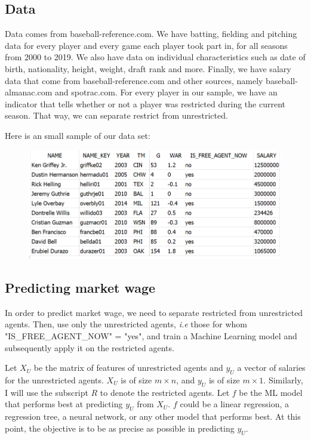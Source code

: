 \documentclass[12pt,a4paper]{article}
\begin{document}
\subsection{Data}

Data comes from baseball-reference.com. We have batting, fielding and pitching data for every player and every game each player took part in, for all seasons from 2000 to 2019. We also have data on individual characteristics such as date of birth, nationality, height, weight, draft rank and more. Finally, we have salary data that come from  baseball-reference.com and other sources, namely baseball-almanac.com and spotrac.com. For every player in our sample, we have an indicator that tells whether or not a player was restricted during the current season. That way, we can separate restrict from unrestricted. 

Here is an small sample of our data set:

\begin{figure}[!h]
	\centering
	\caption[Example of our Data]{}
	\label{fig:dataex1}
	\includegraphics[width=1\linewidth]{data_ex1}
\end{figure}

\subsection{Predicting market wage}

In order to predict market wage, we need to separate restricted from unrestricted agents. Then, use only the unrestricted agents, \textit{i.e} those for whom "IS\_FREE\_AGENT\_NOW" = "yes", and train a Machine Learning model and subsequently apply it on the restricted agents.

Let $X_{U}$ be the matrix of features of unrestricted agents and $y_{U}$ a vector of salaries for the unrestricted agents. $X_{U}$ is of size $m\times n$, and $y_U$ is of size $m\times 1$. Similarly, I will use the subscript $R$ to denote the restricted agents. Let $f$ be the ML model that performs best at predicting $y_{U}$ from $X_{U}$. $f$ could be a linear regression, a regression tree, a neural network, or any other model that performs best. At this point, the objective is to be as precise as possible in predicting $y_U$.
\end{document}
